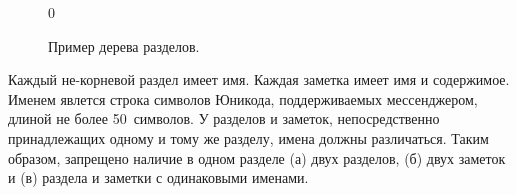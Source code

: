         \begin{figure}[h]
            \centering
            \begingroup
            \newlength{\treeindent}
            \newlength{\treeskip}
            \setlength{\treeindent}{2em}
            \setlength{\treeskip}{-3ex}
            \setcounter{treeline}0
            \newcommand{\mypoint}[2]{(#2 * \treeindent, #1 * \treeskip)}
            \newcommand{\outpoint}[2]{(#2 * \treeindent + 0.75em, #1 * \treeskip - 1.5ex)}
            \newcommand{\midpoint}[2]{(#2 * \treeindent + 0.75em, #1 * \treeskip)}
            \newcommand{\inpoint}[2]{(#2 * \treeindent - 0.1em, #1 * \treeskip)}
            \newcommand{\mynode}[2]{
                \node at \mypoint{\thetreeline}{#1} [anchor = west] {#2};%
                \stepcounter{treeline}%
            }
            \endgroup
            \caption{Пример дерева разделов.}
            \label{fig:req:fn:kb:tree}
        \end{figure}

        Каждый не-корневой раздел имеет имя. Каждая заметка имеет имя и содержимое.
        Именем явлется строка символов Юникода, поддерживаемых мессенджером, длиной
        не более 50~символов. У разделов и заметок, непосредственно принадлежащих одному и тому же
        разделу, имена должны различаться. Таким образом, запрещено наличие в одном разделе
        (а) двух разделов, (б) двух заметок и (в) раздела и заметки с одинаковыми именами.

